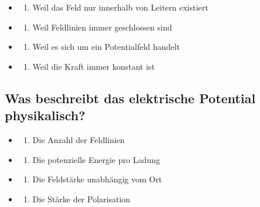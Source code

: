 \documentclass[
  11pt,
]{article}
\providecommand{\tightlist}{%
  \setlength{\itemsep}{0pt}\setlength{\parskip}{0pt}}
\begin{document}
\begin{itemize}
\tightlist
\item
  \begin{enumerate}
  \def\labelenumi{\Alph{enumi})}
  \tightlist
  \item
    Weil das Feld nur innerhalb von Leitern existiert\\
  \end{enumerate}
\item
  \begin{enumerate}
  \def\labelenumi{\Alph{enumi})}
  \setcounter{enumi}{1}
  \tightlist
  \item
    Weil Feldlinien immer geschlossen sind\\
  \end{enumerate}
\item
  \begin{enumerate}
  \def\labelenumi{\Alph{enumi})}
  \setcounter{enumi}{2}
  \tightlist
  \item
    Weil es sich um ein Potentialfeld handelt
  \end{enumerate}
\item
  \begin{enumerate}
  \def\labelenumi{\Alph{enumi})}
  \setcounter{enumi}{3}
  \tightlist
  \item
    Weil die Kraft immer konstant ist
  \end{enumerate}
\end{itemize}

\subsection{Was beschreibt das elektrische Potential
physikalisch?}\label{was-beschreibt-das-elektrische-potential-physikalisch}

\begin{itemize}
\tightlist
\item
  \begin{enumerate}
  \def\labelenumi{\Alph{enumi})}
  \tightlist
  \item
    Die Anzahl der Feldlinien\\
  \end{enumerate}
\item
  \begin{enumerate}
  \def\labelenumi{\Alph{enumi})}
  \setcounter{enumi}{1}
  \tightlist
  \item
    Die potenzielle Energie pro Ladung\\
  \end{enumerate}
\item
  \begin{enumerate}
  \def\labelenumi{\Alph{enumi})}
  \setcounter{enumi}{2}
  \tightlist
  \item
    Die Feldstärke unabhängig vom Ort\\
  \end{enumerate}
\item
  \begin{enumerate}
  \def\labelenumi{\Alph{enumi})}
  \setcounter{enumi}{3}
  \tightlist
  \item
    Die Stärke der Polarisation
  \end{enumerate}
\end{itemize}
\end{document}
